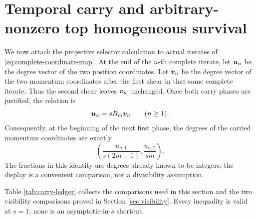 \documentclass[11pt]{article}
\theoremstyle{definition}
\theoremstyle{remark}
\begin{document}
\section{Temporal carry and arbitrary-nonzero top homogeneous survival}
\label{sec:carry}

We now attach the projective selector calculation to actual iterates of
\eqref{eq:complete-coordinate-map}.  At the end of the \(n\)-th complete
iterate, let \(\boldsymbol{u}_n\) be the degree vector of the two position coordinates.
Let \(\boldsymbol{v}_n\) be the degree vector of the two momentum coordinates after the
first shear in that same complete iterate.  Thus the second shear leaves
\(\boldsymbol{v}_n\) unchanged.  Once both carry phases are justified, the relation is
\begin{equation}
\boldsymbol{u}_n=sB_m\boldsymbol{v}_n\qquad(n\geq1).
\label{eq:u-v-relation}
\end{equation}
Consequently, at the beginning of the next first phase, the degrees of the
carried momentum coordinates are exactly
\begin{equation}
\left(\frac{u_{n,1}}{s(2m+1)},\frac{u_{n,2}}{sm}\right).
\label{eq:carried-momentum-degrees}
\end{equation}
The fractions in this identity are degrees already known to be integers; the
display is a convenient comparison, not a divisibility assumption.

Table \ref{tab:carry-ledger} collects the comparisons used in this section
and the two visibility comparisons proved in Section \ref{sec:visibility}.
Every inequality is valid at \(s=1\); none is an asymptotic-in-\(s\)
shortcut.
\end{document}
